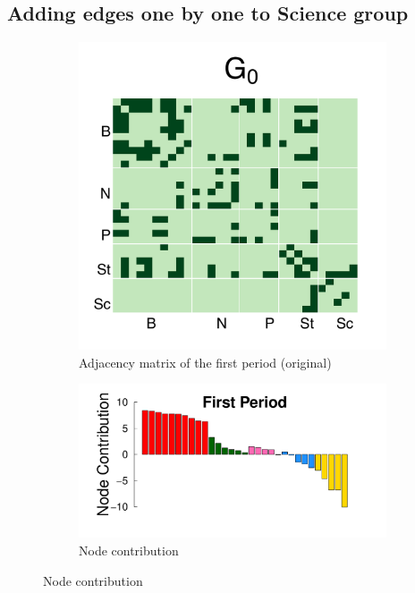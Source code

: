 \documentclass[12pt]{article}
\begin{document}
\subsection*{Adding edges one by one to Science group}
\begin{figure}[h]
	\centering
	\begin{subfigure}[b]{0.3\textwidth}
		\includegraphics[width=\textwidth]{../Figure/sim_Adj0.pdf}
		\caption{Adjacency matrix of the first period (original)}
		\label{fig:step0}
	\end{subfigure}
	\begin{subfigure}[b]{0.6\textwidth}
		\includegraphics[width=\textwidth]{../Figure/step0.pdf}
		\caption{Node contribution}
		\label{fig:adj.step0}
	\end{subfigure}
\end{figure}
\end{document}
